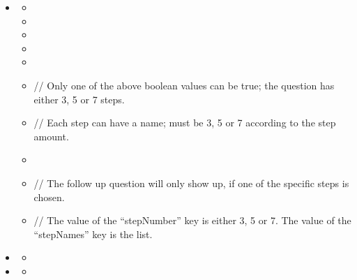 \documentclass[a4paper]{scrreprt}
\begin{document}
\begin{itemize}
                    \item {}
                        \begin{itemize}
                            \item {}
                            \item {}
                            \item {}
                            \item {}
                            \item {}
                            \item {}
                                \par // Only one of the above boolean values can be true; the question has either 3, 5 or 7 steps.
                            \item {}
                                \par // Each step can have a name;  must be 3, 5 or 7 according to the step amount.
                            \item {}
                            \item {}
                                \par // The follow up question will only show up, if one of the specific steps is chosen.
                            \item {}
                               \par // The value of the “stepNumber” key is either 3, 5 or 7. The value of the “stepNames” key is the  list.
                        \end{itemize}

                    \item {}
                        \begin{itemize}
                            \item {}
                        \end{itemize}

                   \item {}
                       \begin{itemize}
                           \item {}
                       \end{itemize}


\end{itemize}
\end{document}
